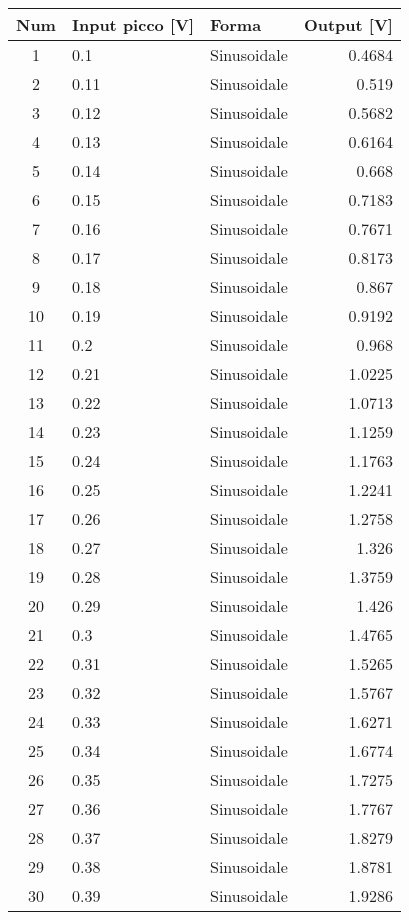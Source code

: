 \documentclass[a4paper]{article}
\begin{document}
	\begin{center}
		\label{set2}
		\begin{tabular}{|c|llr|} 
			\toprule
			Num	&Input picco [V]&	Forma&	Output [V]\\
			\midrule
			1	&	0.1	&	Sinusoidale	&	0.4684	\\
			2	&	0.11	&	Sinusoidale	&	0.519	\\
			3	&	0.12	&	Sinusoidale	&	0.5682	\\
			4	&	0.13	&	Sinusoidale	&	0.6164	\\
			5	&	0.14	&	Sinusoidale	&	0.668	\\
			6	&	0.15	&	Sinusoidale	&	0.7183	\\
			7	&	0.16	&	Sinusoidale	&	0.7671	\\
			8	&	0.17	&	Sinusoidale	&	0.8173	\\
			9	&	0.18	&	Sinusoidale	&	0.867	\\
			10	&	0.19	&	Sinusoidale	&	0.9192	\\
			11	&	0.2	&	Sinusoidale	&	0.968	\\
			12	&	0.21	&	Sinusoidale	&	1.0225	\\
			13	&	0.22	&	Sinusoidale	&	1.0713	\\
			14	&	0.23	&	Sinusoidale	&	1.1259	\\
			15	&	0.24	&	Sinusoidale	&	1.1763	\\
			16	&	0.25	&	Sinusoidale	&	1.2241	\\
			17	&	0.26	&	Sinusoidale	&	1.2758	\\
			18	&	0.27	&	Sinusoidale	&	1.326	\\
			19	&	0.28	&	Sinusoidale	&	1.3759	\\
			20	&	0.29	&	Sinusoidale	&	1.426	\\
			21	&	0.3	&	Sinusoidale	&	1.4765	\\
			22	&	0.31	&	Sinusoidale	&	1.5265	\\
			23	&	0.32	&	Sinusoidale	&	1.5767	\\
			24	&	0.33	&	Sinusoidale	&	1.6271	\\
			25	&	0.34	&	Sinusoidale	&	1.6774	\\
			26	&	0.35	&	Sinusoidale	&	1.7275	\\
			27	&	0.36	&	Sinusoidale	&	1.7767	\\
			28	&	0.37	&	Sinusoidale	&	1.8279	\\
			29	&	0.38	&	Sinusoidale	&	1.8781	\\
			30	&	0.39	&	Sinusoidale	&	1.9286	\\

\end{tabular}
\end{center}
\end{document}
